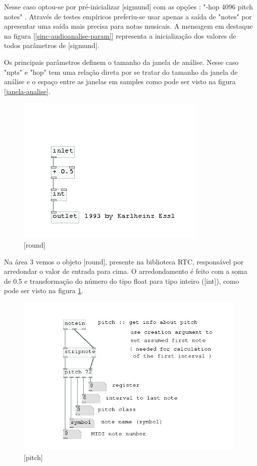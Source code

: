 \documentclass{ppgmus}
\begin{document}
Nesse caso optou-se por pré-inicializar [sigmund\texttildelow] com as
opções : "-hop 4096 pitch notes" . Através de testes empíricos preferiu-se
usar apenas a saída de "notes" por apresentar uma saída mais precisa para notas 
musicais. A mensagem em destaque na figura \ref{[sinc-audioanalise-param]} representa
a inicialização dos valores de todos parâmetros de [sigmund\texttildelow].

Os principais parâmetros definem o tamanho da janela de análise.
Nesse caso "npts" e "hop" tem uma relação direta
por se tratar do tamanho da janela de análise e o espaço
entre as janelas em samples como pode ser visto na figura \ref{janela-analise}.





\begin{figure}
\includegraphics[scale=.7]{round}
\caption{[round]}
\label{round}
\end{figure}


Na área 3 vemos o objeto [round], presente na biblioteca RTC, responsável
por arredondar o valor de entrada para cima. O arredondamento é feito com
a soma de 0.5 e transformação do número do tipo float para tipo inteiro ([int]),
como pode ser visto na figura \ref{round}.


\begin{figure}
\includegraphics[scale=.7]{pitch}
\caption{[pitch]}
\label{pitch}
\end{figure}
\end{document}
